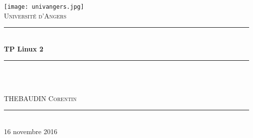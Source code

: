 \documentclass[a4paper,12pt]{article}
\newcommand{\HRule}{\rule{\linewidth}{0.5mm}}
\begin{document}
\begin{titlepage}
  \begin{sffamily}
  \begin{center}

    \texttt{[image: univangers.jpg]}~\\[1.5cm]

    \textsc{\LARGE Université d'Angers}\\[2cm]

   

    \HRule \\[0.4cm]
    { \huge \bfseries TP Linux 2}
    \HRule \\[2cm]
    \\[2cm]
    

    \begin{minipage}{0.4\textwidth}
      \begin{flushleft} \large
        THEBAUDIN \textsc{Corentin}\\
      \end{flushleft}
    \end{minipage}
    

    \vfill
    \HRule\\[2cm]
    {\large 16 novembre 2016}

  \end{center}
  \end{sffamily}
\end{titlepage}
\clearpage

\tableofcontents

\clearpage



\section{}
\paragraph{}

\clearpage
\end{document}
